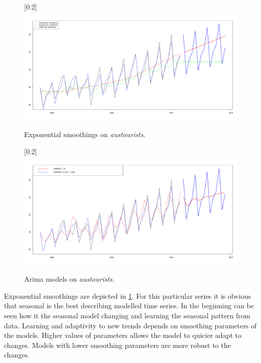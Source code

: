     \begin{figure}[H]
        \begin{center}
            \scalebox{0.25}[0.2]{\includegraphics{img/exp-smoothings.pdf}}
            \caption{Exponential smoothings on \emph{austourists}.}
            \label{img:exp-smoothings}
        \end{center}
    \end{figure}

    \begin{figure}[H]
        \begin{center}
            \scalebox{0.25}[0.2]{\includegraphics{img/arima-sarima.pdf}}
            \caption{Arima models on \emph{austourists}.}
            \label{img:arimas}
        \end{center}
    \end{figure}

    Exponential smoothings are depicted in \ref{img:exp-smoothings}. For this particular series it is obvious that
    seasonal is the best describing modelled time series. In the beginning can be seen how it the seasonal model
    changing and learning the seasonal pattern from data. Learning and adaptivity to new trends depends on smoothing
    parameters of the models. Higher values of parameters allows the model to quicier adapt to changes. Models with
    lower smoothing parameters are more robust to the changes.

